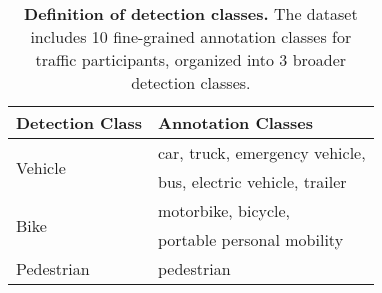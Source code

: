 \begin{table}
\centering
\begin{tabular}{ @{} l  l @{}} 
\toprule
\textbf{Detection Class} & \textbf{Annotation Classes}  \\ 
\midrule
\multirow{2}{*}{Vehicle} & car, truck, emergency vehicle,   \\ 
                         & bus, electric vehicle, trailer \\
\midrule
\multirow{2}{*}{Bike} & motorbike, bicycle, \\
                      & portable personal mobility \\
\midrule
Pedestrian & pedestrian \\
\bottomrule
\end{tabular}
\caption{\small \textbf{Definition of detection classes.} The \ours dataset includes 10 fine-grained annotation classes for traffic participants, organized into 3 broader detection classes.} \label{tab:anno_cls_to_det_cls}
\end{table}